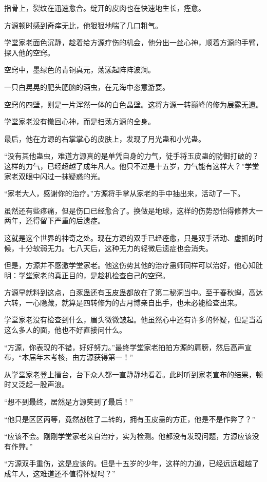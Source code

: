 \begin{this_body}
指骨上，裂纹在迅速愈合。绽开的皮肉也在快速地生长，痊愈。

方源顿时感到奇痒无比，他狠狠地喘了几口粗气。

学堂家老面色沉静，趁着给方源疗伤的机会，他分出一丝心神，顺着方源的手臂，探入他的空窍。

空窍中，墨绿色的青铜真元，荡漾起阵阵波澜。

一只白晃晃的肥头肥脑的酒虫，在元海中恣意游耍。

空窍的四壁，则是一片浑然一体的白色晶壁。这将方源一转巅峰的修为展露无遗。

学堂家老没有撤回心神，而是扫荡方源的全身。

最后，他在方源的右掌掌心的皮肤上，发现了月光蛊和小光蛊。

“没有其他蛊虫，难道方源真的是单凭自身的力气，徒手将玉皮蛊的防御打破的？这样的力气，已经超越了成年凡人。他只不过是十五岁，力气能有这样大？”学堂家老双眼中闪过一抹疑惑的光。

“家老大人，感谢你的治疗。”方源将手掌从家老的手中抽出来，活动了一下。

虽然还有些疼痛，但是伤口已经愈合了。换做是地球，这样的伤势恐怕得修养大一两年，还得留下严重的后遗症。

这就是这个世界的神奇之处。现在方源的双手已经痊愈，只是双手活动、虚抓的时候，十分软弱无力。七八天后，这种无力的轻微后遗症也会消失。

但是，方源并不感激学堂家老。他这伤势其他的治疗蛊师同样可以治好，他心知肚明：学堂家老的真正目的，是趁机检查自己的空窍。

方源早就料到这点，白豕蛊还有玉皮蛊都放在了第二秘洞当中。至于春秋蝉，高达六转，一心隐藏，就算是四转修为的古月博亲自出手，也未必能检查出来。

学堂家老没有检查到什么，眉头微微皱起。他虽然心中还有许多的怀疑，但是当着这么多人的面，他也不好直接问什么。

“方源，你表现的不错，好好努力。”最终学堂家老拍拍方源的肩膀，然后高声宣布，“本届年末考核，由方源获得第一！”

从学堂家老登上擂台，台下众人都一直静静地看着。此时听到家老宣布的结果，顿时又泛起一股声浪。

“想不到最终，居然是方源笑到了最后！”

“他只是区区丙等，竟然战胜了二转的，拥有玉皮蛊的方正，他是不是作弊了？”

“应该不会。刚刚学堂家老亲自治疗，实为检测。他都没有发现问题，方源应该没有作弊。”

“方源双手重伤，这是应该的。但是十五岁的少年，这样的力道，已经远远超越了成年人，这难道还不值得怀疑吗？”


\end{this_body}
